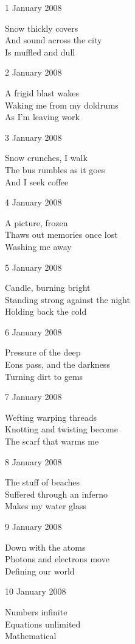 \documentclass[12pt]{article}
\begin{document}
1 January 2008

Snow thickly covers \\
And sound across the city \\
Is muffled and dull

2 January 2008

A frigid blast wakes \\
Waking me from my doldrums \\
As I'm leaving work

3 January 2008

Snow crunches, I walk \\
The bus rumbles as it goes \\
And I seek coffee

\newpage

4 January 2008

A picture, frozen \\
Thaws out memories once lost \\
Washing me away

5 January 2008

Candle, burning bright \\
Standing strong against the night \\
Holding back the cold

6 January 2008

Pressure of the deep \\
Eons pass, and the darkness \\
Turning dirt to gems

7 January 2008

Wefting warping threads \\
Knotting and twisting become \\
The scarf that warms me

8 January 2008

The stuff of beaches \\
Suffered through an inferno \\
Makes my water glass

9 January 2008

Down with the atoms \\
Photons and electrons move \\
Defining our world

10 January 2008

Numbers infinite \\
Equations unlimited \\
Mathematical \

\newpage
\end{document}
